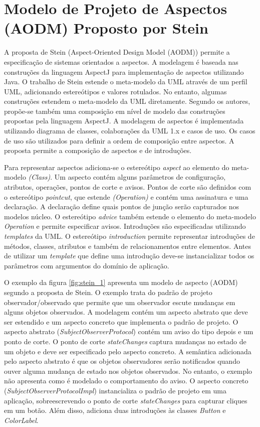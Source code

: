 \section{Modelo de Projeto de Aspectos (AODM) Proposto por Stein}

A proposta de Stein (Aspect-Oriented Design Model (AODM)) \cite{stein:02} \cite{Stein02onrepresenting} \cite{stein:aosd-uml02} permite a especificação
de sistemas orientados a aspectos. A modelagem é baseada nas construções da linguagem AspectJ para implementação de aspectos utilizando Java. O
trabalho de Stein estende o meta-modelo da UML através de um perfil UML, adicionando estereótipos e valores rotulados. No entanto, algumas
construções estendem o meta-modelo da UML diretamente. Segundo os autores, propõe-se também uma composição em nível de modelo das construções
propostas pela linguagem AspectJ. A modelagem de aspectos é implementada utilizando diagrama de classes, colaborações da UML 1.x e casos de uso. Os
casos de uso são utilizados para definir a ordem de composição entre aspectos. A proposta permite a composição de aspectos e de introduções.

Para representar aspectos adiciona-se o estereótipo \textit{aspect} ao elemento do meta-modelo \textit{(Class)}. Um aspecto contém alguns parâmetros
de configuração, atributos, operações, pontos de corte e avisos. Pontos de corte são definidos com o estereótipo \textit{pointcut}, que 
estende \textit{(Operation)} e contém uma assinatura e uma declaração. A declaração define quais pontos de junção serão capturados nos modelos
núcleo. O estereótipo \textit{advice} também estende o elemento do meta-modelo \textit{Operation} e permite especificar avisos. 
Introduções são especificadas utilizando \textit{templates} da UML.  O estereótipo \textit{introduction} permite representar introduções de métodos,
classes, atributos e também de relacionamentos entre elementos. Antes de utilizar um \textit{template} que define uma introdução deve-se instancializar 
todos os parâmetros com argumentos do domínio de aplicação. 

O exemplo da figura \ref{fig:stein_1} apresenta um modelo de aspecto (AODM) segundo a proposta de Stein. O exemplo trata do padrão de projeto
observador/observado que permite que um observador escute mudanças em alguns objetos observados. A modelagem contém um aspecto abstrato que deve ser
estendido e um aspecto concreto que implementa o padrão de projeto. O aspecto abstrato (\textit{SubjectObserverProtocol}) contém um aviso do tipo
depois e um ponto de corte. O ponto de corte \textit{stateChanges} captura mudanças no estado de um objeto e deve ser especificado pelo aspecto
concreto. A semântica adicionada pelo aspecto abstrato é que os objetos observadores serão notificados quando ouver alguma mudança de estado nos
objetos observados. No entanto, o exemplo não apresenta como é modelado o comportamento do aviso. O aspecto concreto
(\textit{SubjectObserverProtocolImpl}) instancializa o padrão de projeto em uma aplicação, sobreescrevendo o ponto de corte \textit{stateChanges} para 
capturar cliques em um botão. Além disso, adiciona duas introduções às classes \textit{Button} e \textit{ColorLabel}. 

